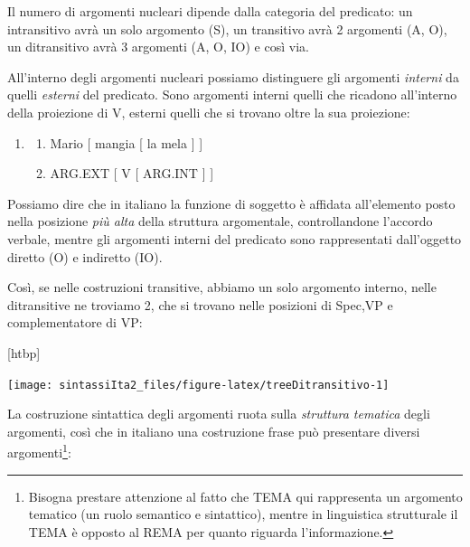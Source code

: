\documentclass[
  a4paper,
  twoside,
  11pt,
  chapterprefix=false,
  bibliography=totocnumbered,
  listof=flat]{scrbook}
\makeatletter
\providecommand{\tightlist}{%
  \setlength{\itemsep}{0pt}\setlength{\parskip}{0pt}}
\def\fps@figure{htbp}
\renewenvironment{figure}[1][\fps@figure]{
  \edef\@tempa{\noexpand\@float{figure}[#1]} 
  \@tempa
  \sffamily
}{
  \end@float
}
\makeatother
\begin{document}
Il numero di argomenti nucleari dipende dalla categoria del predicato: un intransitivo avrà un solo argomento (S), un transitivo avrà 2 argomenti (A, O), un ditransitivo avrà 3 argomenti (A, O, IO) e così via.

All'interno degli argomenti nucleari possiamo distinguere gli argomenti \emph{interni} da quelli \emph{esterni} del predicato.
Sono argomenti interni quelli che ricadono all'interno della proiezione di V, esterni quelli che si trovano oltre la sua proiezione:

\begin{enumerate}
\def\labelenumi{(\arabic{enumi})}
\setcounter{enumi}{12}
\item
  \begin{enumerate}
  \def\labelenumii{\alph{enumii}.}
  \tightlist
  \item
    Mario {[} mangia {[} la mela {]} {]}
  \item
    ARG.EXT {[} V {[} ARG.INT {]} {]}
  \end{enumerate}
\end{enumerate}

Possiamo dire che in italiano la funzione di soggetto è affidata all'elemento posto nella posizione \emph{più alta} della struttura argomentale, controllandone l'accordo verbale, mentre gli argomenti interni del predicato sono rappresentati dall'oggetto diretto (O) e indiretto (IO).

Così, se nelle costruzioni transitive, abbiamo un solo argomento interno, nelle ditransitive ne troviamo 2, che si trovano nelle posizioni di Spec,VP e complementatore di VP:

\begin{figure}

{\centering \texttt{[image: sintassiIta2\_files/figure-latex/treeDitransitivo-1]} 

}

\caption{Transitivi e ditransitivi}\label{fig:treeDitransitivo}
\end{figure}

La costruzione sintattica degli argomenti ruota sulla \emph{struttura tematica} degli argomenti, così che in italiano una costruzione frase può presentare diversi argomenti\footnote{Bisogna prestare attenzione al fatto che TEMA qui rappresenta un argomento tematico (un ruolo semantico e sintattico), mentre in linguistica strutturale il TEMA è opposto al REMA per quanto riguarda l'informazione.}:
\end{document}
